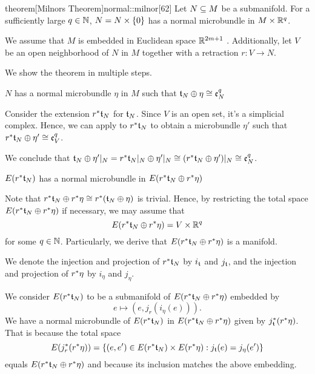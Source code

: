 \begin{scope} \newcommand{\rwhitney} { \whitney{\ind{r}\bt_N}{\ind{r}\eta} } \newcommand{\rtn} { \ind{r}\bt_N }

\begin{mystatement}{theorem}[Milnors Theorem]{normal::milnor}[62] Let $N \sub M$ be a submanifold. For a sufficiently large $q \in \N$, $N = \cyldown{N}$ has a normal microbundle in $M \cross \R^q$. \end{mystatement}

\begin{myproof} We assume that $M$ is embedded in Euclidean space $\R^{2m + 1}$ \cite[p.60]{dimension}. Additionally, let $V$ be an open neighborhood of $N$ in $M$ together with a retraction $r: V \to N$.

We show the theorem in multiple steps. \begin{steps} \item $N$ has a normal microbundle $\eta$ in $M$ such that $\whitney{\bt_N}{\eta} \cong \be[q]{N}$

Consider the extension $\ind{r}\bt_N$ for $\bt_N$. Since $V$ is an open set, it's a simplicial complex. Hence, we can apply  to $\ind{r}\bt_N$ to obtain a microbundle $\eta'$ such that $\whitney{\ind{r}\bt_N}{\eta'} \cong \be[q]{V}$.

We conclude that $\whitney{\bt_N}{\eta'\restr{N}} = \whitney{\ind{r}\bt_N\restr{N}}{\eta'\restr{N}} \cong (\whitney{\ind{r}\bt_N}{\eta'})\restr{N} \cong \be[q]{N}$.

\item $E(\rtn)$ has a normal microbundle in $E(\rwhitney)$

Note that $\rwhitney \cong \ind{r}(\whitney{\bt_N}{\eta})$ is trivial. Hence, by restricting the total space $E(\rwhitney)$ if necessary, we may assume that \[ E(\rwhitney) = V \cross \R^q \] for some $q \in \N$. Particularly, we derive that $E(\rwhitney)$ is a manifold.

We denote the injection and projection of $\rtn$ by $i_{\bt}$ and $j_{\bt}$, and the injection and projection of $\ind{r}\eta$ by $i_{\eta}$ and $j_{\eta}$.

We consider $E(\rtn)$ to be a submanifold of $E(\rwhitney)$ embedded by \[ e \mapsto (e, j_{r}(i_{\eta}(e))). \] We have a normal microbundle of $E(\rtn)$ in $E(\rwhitney)$ given by $\ind{j_{\bt}}(\ind{r}\eta)$. That is because the total space \[ E(\ind{j_r}(\ind{r}\eta)) = \set{(e, e') \in E(\rtn) \cross E(\ind{r}\eta)}{j_{\bt}(e) = j_\eta(e')} \] equals $E(\rwhitney)$ and because its inclusion matches the above embedding.


\end{steps}
\end{myproof}
\end{scope}
